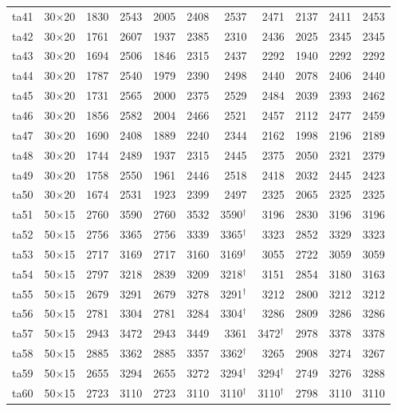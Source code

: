 {\begin{longtable}{lrrrrrrrrrr}
ta41 & 30$\times$20 & 1830 & 2543 & 2005 & 2408 & 2537 & 2471 & 2137 & 2411 & 2453 \\
ta42 & 30$\times$20 & 1761 & 2607 & 1937 & 2385 & 2310 & 2436 & 2025 & 2345 & 2345 \\
ta43 & 30$\times$20 & 1694 & 2506 & 1846 & 2315 & 2437 & 2292 & 1940 & 2292 & 2292 \\
ta44 & 30$\times$20 & 1787 & 2540 & 1979 & 2390 & 2498 & 2440 & 2078 & 2406 & 2440 \\
ta45 & 30$\times$20 & 1731 & 2565 & 2000 & 2375 & 2529 & 2484 & 2039 & 2393 & 2462 \\
ta46 & 30$\times$20 & 1856 & 2582 & 2004 & 2466 & 2521 & 2457 & 2112 & 2477 & 2459 \\
ta47 & 30$\times$20 & 1690 & 2408 & 1889 & 2240 & 2344 & 2162 & 1998 & 2196 & 2189 \\
ta48 & 30$\times$20 & 1744 & 2489 & 1937 & 2315 & 2445 & 2375 & 2050 & 2321 & 2379 \\
ta49 & 30$\times$20 & 1758 & 2550 & 1961 & 2446 & 2518 & 2418 & 2032 & 2445 & 2423 \\
ta50 & 30$\times$20 & 1674 & 2531 & 1923 & 2399 & 2497 & 2325 & 2065 & 2325 & 2325 \\
ta51 & 50$\times$15 & 2760 & 3590 & 2760 & 3532 & 3590$^\dagger$ & 3196 & 2830 & 3196 & 3196 \\
ta52 & 50$\times$15 & 2756 & 3365 & 2756 & 3339 & 3365$^\dagger$ & 3323 & 2852 & 3329 & 3323 \\
ta53 & 50$\times$15 & 2717 & 3169 & 2717 & 3160 & 3169$^\dagger$ & 3055 & 2722 & 3059 & 3059 \\
ta54 & 50$\times$15 & 2797 & 3218 & 2839 & 3209 & 3218$^\dagger$ & 3151 & 2854 & 3180 & 3163 \\
ta55 & 50$\times$15 & 2679 & 3291 & 2679 & 3278 & 3291$^\dagger$ & 3212 & 2800 & 3212 & 3212 \\
ta56 & 50$\times$15 & 2781 & 3304 & 2781 & 3284 & 3304$^\dagger$ & 3286 & 2809 & 3286 & 3286 \\
ta57 & 50$\times$15 & 2943 & 3472 & 2943 & 3449 & 3361 & 3472$^\dagger$ & 2978 & 3378 & 3378 \\
ta58 & 50$\times$15 & 2885 & 3362 & 2885 & 3357 & 3362$^\dagger$ & 3265 & 2908 & 3274 & 3267 \\
ta59 & 50$\times$15 & 2655 & 3294 & 2655 & 3272 & 3294$^\dagger$ & 3294$^\dagger$ & 2749 & 3276 & 3288 \\
ta60 & 50$\times$15 & 2723 & 3110 & 2723 & 3110 & 3110$^\dagger$ & 3110$^\dagger$ & 2798 & 3110 & 3110 \\

\end{longtable}}
